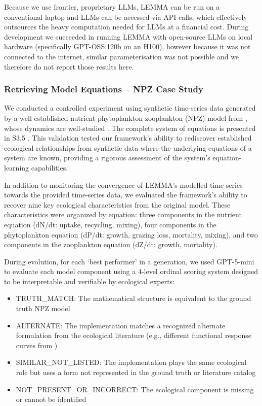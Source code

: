 Because we use frontier, proprietary LLMs, LEMMA can be run on a conventional laptop and LLMs can be accessed via API calls, which effectively outsources the heavy computation needed for LLMs at a financial cost. During development we succeeded in running LEMMA with open-source LLMs on local hardware (specifically GPT-OSS:120b on an H100), however because it was not connected to the internet, similar parameterisation was not possible and we therefore do not report those results here. 

\subsubsection{Retrieving Model Equations -- NPZ Case Study}

We conducted a controlled experiment using synthetic time-series data generated by a well-established nutrient-phytoplankton-zooplankton (NPZ) model from \cite{edwards1999zooplankton}, whose dynamics are well-studied \citep{boschetti2008mapping,boschetti2010detecting}. The complete system of equations is presented in S3.5%
. This validation tested our framework's ability to rediscover established ecological relationships from synthetic data where the underlying equations of a system are known, providing a rigorous assessment of the system's equation-learning capabilities.

In addition to monitoring the convergence of LEMMA's modelled time-series towards the provided time-series data, we evaluated the framework's ability to recover nine key ecological characteristics from the original model. These characteristics were organized by equation: three components in the nutrient equation (dN/dt: uptake, recycling, mixing), four components in the phytoplankton equation (dP/dt: growth, grazing loss, mortality, mixing), and two components in the zooplankton equation (dZ/dt: growth, mortality).

During evolution, for each `best performer' in a generation, we used GPT-5-mini to evaluate each model component using a 4-level ordinal scoring system designed to be interpretable and verifiable by ecological experts:

\begin{itemize}
    \item TRUTH\_MATCH: The mathematical structure is equivalent to the ground truth NPZ model
    \item ALTERNATE: The implementation matches a recognized alternate formulation from the ecological literature (e.g., different functional response curves from \citep{franks2002npz})
    \item SIMILAR\_NOT\_LISTED: The implementation plays the same ecological role but uses a form not represented in the ground truth or literature catalog
    \item NOT\_PRESENT\_OR\_INCORRECT: The ecological component is missing or cannot be identified
\end{itemize}

